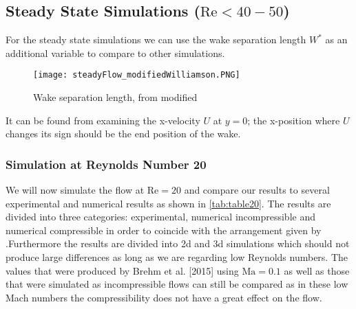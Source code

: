 	\subsection{Steady State Simulations ($\text{Re} < 40-50$)}
	For the steady state simulations we can use the wake separation length $W^*$ as an additional variable to compare to other simulations.
			\begin{figure}[htp]
				\centering
				\texttt{[image: steadyFlow\_modifiedWilliamson.PNG]}
				\caption{Wake separation length, from \cite{williamson1996vortex} modified }
				\label{fig:wakeSeparation}
			\end{figure} 
	It can be found from examining the x-velocity $U$ at $y=0$; the x-position where $U$ changes its sign should be the end position of the wake.

	
	\subsubsection{Simulation at Reynolds Number 20}
	We will now simulate the flow at $\text{Re}=20$ and compare our results to several experimental and numerical results as shown in \cref{tab:table20}. The results are divided into three categories: experimental, numerical incompressible and numerical compressible in order to coincide with the arrangement given by \textcite{ayers}.Furthermore the results are divided into \gls{2d} and \gls{3d} simulations which should not produce large differences as long as we are regarding low Reynolds numbers. The values that were produced by Brehm et al. [2015] using $\text{Ma} = 0.1$ as well as those that were simulated as incompressible flows can still be compared as in these low Mach numbers the compressibility does not have a great effect on the flow.

